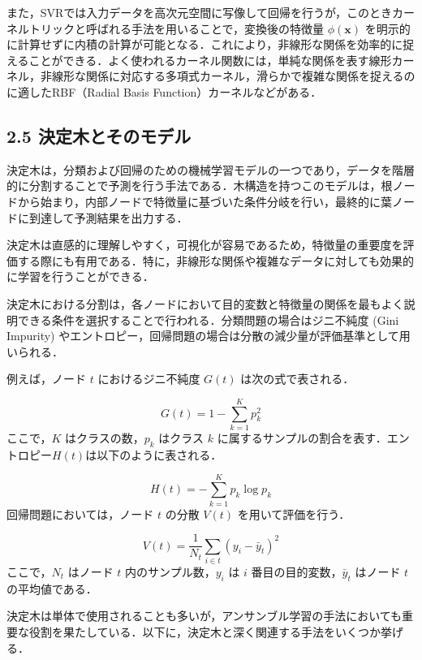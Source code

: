 また，SVRでは入力データを高次元空間に写像して回帰を行うが，このときカーネルトリックと呼ばれる手法を用いることで，変換後の特徴量 $\phi(\mathbf{x})$ を明示的に計算せずに内積の計算が可能となる．これにより，非線形な関係を効率的に捉えることができる．よく使われるカーネル関数には，単純な関係を表す線形カーネル，非線形な関係に対応する多項式カーネル，滑らかで複雑な関係を捉えるのに適したRBF（Radial Basis Function）カーネルなどがある．

\subsection*{2.5 決定木とそのモデル}
決定木は，分類および回帰のための機械学習モデルの一つであり，データを階層的に分割することで予測を行う手法である\cite{prml}．木構造を持つこのモデルは，根ノードから始まり，内部ノードで特徴量に基づいた条件分岐を行い，最終的に葉ノードに到達して予測結果を出力する．

決定木は直感的に理解しやすく，可視化が容易であるため，特徴量の重要度を評価する際にも有用である．特に，非線形な関係や複雑なデータに対しても効果的に学習を行うことができる．

決定木における分割は，各ノードにおいて目的変数と特徴量の関係を最もよく説明できる条件を選択することで行われる．分類問題の場合はジニ不純度 (Gini Impurity) \cite{gini}やエントロピー，回帰問題の場合は分散の減少量が評価基準として用いられる．

例えば，ノード $t$ におけるジニ不純度 $G(t)$ は次の式で表される．

\begin{equation}
	G(t) = 1 - \sum_{k=1}^{K} p_k^2
\end{equation}
ここで，$K$ はクラスの数，$p_k$ はクラス $k$ に属するサンプルの割合を表す．エントロピー$H(t)$は以下のように表される．

\begin{equation}
	H(t) = - \sum_{k=1}^{K} p_k \log p_k
\end{equation}
回帰問題においては，ノード $t$ の分散 $V(t)$ を用いて評価を行う．

\begin{equation}
	V(t) = \frac{1}{N_t} \sum_{i \in t} (y_i - \bar{y}_t)^2
\end{equation}
ここで，$N_t$ はノード $t$ 内のサンプル数，$y_i$ は $i$ 番目の目的変数，$\bar{y}_t$ はノード $t$ の平均値である．


決定木は単体で使用されることも多いが，アンサンブル学習の手法においても重要な役割を果たしている．以下に，決定木と深く関連する手法をいくつか挙げる．


